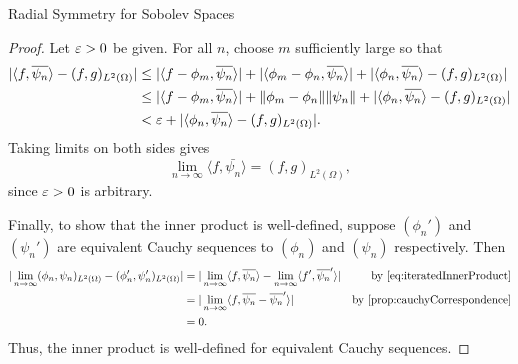\begin{chapter}{Radial Symmetry for Sobolev Spaces}
\begin{proof}
Let $\varepsilon > 0$ be given. 
For all $n$, choose $m$ sufficiently large so that
\begin{align}
  |\langle f,\overline{\psi_n}\rangle - (f,g)_{L^2(\Omega)}| 
    &\le |\langle f - \phi_m,\overline{\psi_n}\rangle| + |\langle \phi_m - \phi_n, \overline{\psi_n}\rangle| + |\langle \phi_n,\overline{\psi_n}\rangle - (f,g)_{L^2(\Omega)}| \nonumber\\
    &\le |\langle f - \phi_m,\overline{\psi_n}\rangle| + \| \phi_m - \phi_n\| \|\psi_n\| + |\langle \phi_n,\overline{\psi_n}\rangle - (f,g)_{L^2(\Omega)}| \nonumber\\
    &< \varepsilon +|\langle \phi_n,\overline{\psi_n}\rangle - (f,g)_{L^2(\Omega)}|.
\end{align}
Taking limits on both sides gives 
\begin{equation} \label{eq:iteratedInnerProduct}
  \lim_{n\to\infty} \langle f,\bar{\psi_n}\rangle = (f,g)_{L^2(\Omega)}, 
\end{equation}
since $\varepsilon>0$ is arbitrary.

Finally, to show that the inner product is well-defined, suppose $(\phi_n')$ and $(\psi_n')$ are equivalent Cauchy sequences to $(\phi_n)$ and $(\psi_n)$ respectively.
Then
\begin{align}
  |\lim_{n\to\infty}(\phi_n,\psi_n)_{L^2(\Omega)} - (\phi_n',\psi_n')_{L^2(\Omega)}| 
  &= |\lim_{n\to\infty}\langle f,\bar{\psi_n}\rangle - \lim_{n\to\infty}\langle f',\bar{\psi_n}'\rangle| &\text{by \eqref{eq:iteratedInnerProduct}}\nonumber\\
  &= |\lim_{n\to\infty}\langle f,\bar{\psi_n} - \bar{\psi_n}'\rangle| &\text{by \Cref{prop:cauchyCorrespondence}}\nonumber \\
  &= 0 \nonumber.
\end{align}
Thus, the inner product is well-defined for equivalent Cauchy sequences.
\end{proof}


\end{chapter}
